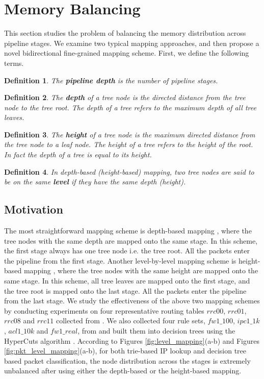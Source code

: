 \documentclass{sigcomm-alternate}
\begin{document}
\section{Memory Balancing}
\label{sec:membalance}

This section studies the problem of balancing the memory distribution across pipeline stages. We examine two typical mapping approaches, and then propose a novel bidirectional fine-grained mapping scheme.
First, we define the following terms.
\newtheorem{theorem}{Definition}

\begin{theorem}
The \textbf{pipeline depth} is the number of pipeline stages.
\end{theorem}
\begin{theorem}
The \textbf{depth} of a tree node is the directed distance from the tree node to the tree root. The depth of a tree refers to the maximum depth of all tree leaves.
\end{theorem}
\begin{theorem}
The \textbf{height} of a tree node is the maximum directed distance from the tree node to a leaf node. The height of a tree refers to the height of the root. In fact the depth of a tree is equal to its height.
\end{theorem}
\begin{theorem}
In depth-based (height-based) mapping, two tree nodes are said to be on the same \textbf{level} if they have the same depth (height).
\end{theorem}

\subsection{Motivation}
\label{sec:motivation}

The most straightforward mapping scheme is depth-based mapping \cite{infocom03:basu}, where the tree nodes with the same depth are mapped onto the same stage. In this scheme, the first stage always has one tree node i.e. the tree root. All the packets enter the pipeline from the first stage.
Another level-by-level mapping scheme is height-based mapping \cite{sigcomm05:hasan}, where the tree nodes with the same height are mapped onto the same stage. In this scheme, all tree leaves are mapped onto the first stage, and the tree root is mapped onto the last stage. All the packets enter the pipeline from the last stage. 
We study the effectiveness of the above two mapping schemes by conducting experiments on four representative routing tables $rrc00$, $rrc01$, $rrc08$ and $rrc11$ collected from \cite{ripe:ris}. We also collected four rule sets, $fw1\_100$, $ipc1\_1k$, $acl1\_10k$ and $fw1\_real$, from \cite{ruleset} and built them into decision trees using the HyperCuts algorithm \cite{sigcomm03:singh}. According to Figures \ref{fig:level_mapping}(a-b) and Figures \ref{fig:pkt_level_mapping}(a-b), for both trie-based IP lookup and decision tree based packet classification, the node distribution across the stages is extremely unbalanced after using either the depth-based or the height-based mapping. 
\end{document}
